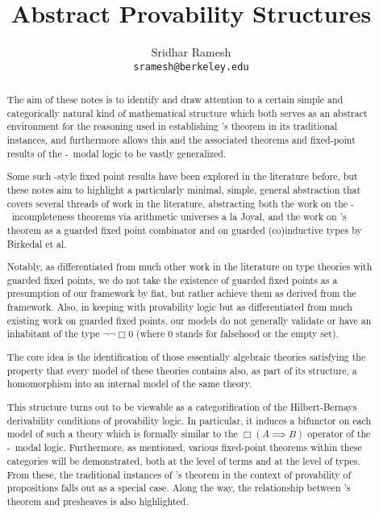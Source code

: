 \documentclass[12pt]{article}
\title{Abstract Provability Structures}
\author{
  Sridhar Ramesh\\
  \texttt{sramesh@berkeley.edu}
}
\begin{document}
\maketitle

\begin{abstract}
The aim of these notes is to identify and draw attention to a certain simple and categorically natural kind of mathematical structure which both serves as an abstract environment for the reasoning used in establishing \Loeb's theorem in its traditional instances, and furthermore allows this and the associated theorems and fixed-point results of the \Goedel-\Loeb\ modal logic to be vastly generalized.

Some such \Loeb-style fixed point results have been explored in the literature before, but these notes aim to highlight a particularly minimal, simple, general abstraction that covers several threads of work in the literature, abstracting both the work on the \Goedel-\Loeb\ incompleteness theorems via arithmetic universes a la Joyal, and the work on \Loeb's theorem as a guarded fixed point combinator and on guarded (co)inductive types by Birkedal et al.

Notably, as differentiated from much other work in the literature on type theories with guarded fixed points, we do not take the existence of guarded fixed points as a presumption of our framework by fiat, but rather achieve them as derived from the framework. Also, in keeping with provability logic but as differentiated from much existing work on guarded fixed points, our models do not generally validate or have an inhabitant of the type $\neg \neg \Box 0$ (where $0$ stands for falsehood or the empty set).

The core idea is the identification of those essentially algebraic theories satisfying the property that every model of these theories contains also, as part of its structure, a homomorphism into an internal model of the same theory.

This structure turns out to be viewable as a categorification of the Hilbert-Bernays derivability conditions of provability logic. In particular, it induces a bifunctor on each model of such a theory which is formally similar to the $\Box(A \implies B)$ operator of the \Goedel-\Loeb\ modal logic. Furthermore, as mentioned, various fixed-point theorems within these categories will be demonstrated, both at the level of terms and at the level of types. From these, the traditional instances of \Loeb's theorem in the context of provability of propositions falls out as a special case. Along the way, the relationship between \Loeb's theorem and presheaves is also highlighted.


\end{abstract}
\end{document}
